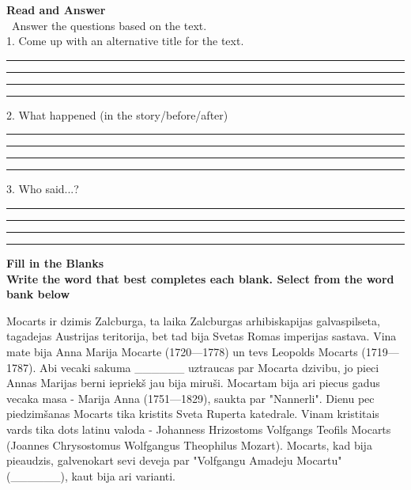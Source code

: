 \documentclass[a4paper]{article}
\begin{document}
\textbf{\Large Read and Answer}
\\
\vspace{5mm}
\
Answer the questions based on the text.
\\
\vspace{5mm}
1. Come up with an alternative title for the text.
\vspace{5mm}
\\
\hrule \vspace{5mm}
\hrule \vspace{5mm}
\hrule \vspace{5mm}
\hrule \vspace{5mm}
\vspace{5mm}
2. What happened (in the story/before/after)
\vspace{5mm}
\\
\hrule \vspace{5mm}
\hrule \vspace{5mm}
\hrule \vspace{5mm}
\hrule \vspace{5mm}
\vspace{5mm}
3. Who said...?
\vspace{5mm}
\\
\hrule \vspace{5mm}
\hrule \vspace{5mm}
\hrule \vspace{5mm}
\hrule \vspace{5mm}
\vspace{5mm}
\pagebreak
\Large \textbf{Fill in the Blanks}
\\ \vspace{5mm}
\normalsize \textbf{Write the word that best completes each blank. Select from the word bank below}\\
\vspace{5mm}
\raggedright Mocarts ir dzimis Zalcburga, ta laika Zalcburgas arhibiskapijas galvaspilseta, tagadejas Austrijas teritorija, bet tad bija Svetas Romas imperijas sastava. Vina mate bija Anna Marija Mocarte (1720—1778) un tevs Leopolds Mocarts (1719—1787). Abi vecaki sakuma \_\_\_\_\_\_ uztraucas par Mocarta dzivibu, jo pieci Annas Marijas berni iepriekš jau bija miruši. Mocartam bija ari piecus gadus vecaka masa - Marija Anna (1751—1829), saukta par "Nannerli". Dienu pec piedzimšanas Mocarts tika kristits Sveta Ruperta katedrale. Vinam kristitais vards tika dots latinu valoda - Johanness Hrizostoms Volfgangs Teofils Mocarts (Joannes Chrysostomus Wolfgangus Theophilus Mozart). Mocarts, kad bija pieaudzis, galvenokart sevi deveja par "Volfgangu Amadeju Mocartu" (\_\_\_\_\_\_), kaut bija ari varianti.
\end{document}
